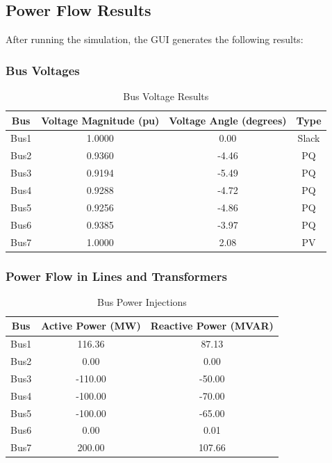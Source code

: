 \documentclass{article}
\begin{document}
	\subsection{Power Flow Results}
	
	After running the simulation, the GUI generates the following results:
	
	\subsubsection{Bus Voltages}
	
	\begin{table}[H]
		\centering
		\begin{tabular}{cccc}
			\hline
			\textbf{Bus} & \textbf{Voltage Magnitude (pu)} & \textbf{Voltage Angle (degrees)} & \textbf{Type} \\
			\hline
			Bus1 & 1.0000 & 0.00 & Slack \\
			Bus2 & 0.9360 & -4.46 & PQ \\
			Bus3 & 0.9194 & -5.49 & PQ \\
			Bus4 & 0.9288 & -4.72 & PQ \\
			Bus5 & 0.9256 & -4.86 & PQ \\
			Bus6 & 0.9385 & -3.97 & PQ \\
			Bus7 & 1.0000 & 2.08 & PV \\
			\hline
		\end{tabular}
		\caption{Bus Voltage Results}
		\label{tab:voltage_results}
	\end{table}
	
	\subsubsection{Power Flow in Lines and Transformers}
	
	\begin{table}[H]
		\centering
		\begin{tabular}{ccc}
			\hline
			\textbf{Bus} & \textbf{Active Power (MW)} & \textbf{Reactive Power (MVAR)} \\
			\hline
			Bus1 & 116.36 & 87.13 \\
			Bus2 & 0.00 & 0.00 \\
			Bus3 & -110.00 & -50.00 \\
			Bus4 & -100.00 & -70.00 \\
			Bus5 & -100.00 & -65.00 \\
			Bus6 & 0.00 & 0.01 \\
			Bus7 & 200.00 & 107.66 \\
			\hline
		\end{tabular}
		\caption{Bus Power Injections}
		\label{tab:power_injections}
	\end{table}
	
\end{document}
